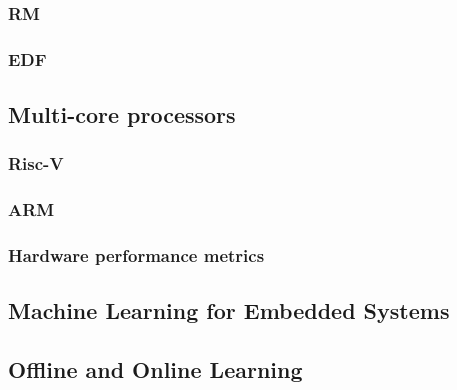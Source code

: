 \documentclass[journal,onecolumn]{IEEEtran}
\begin{document}
\subsubsection{RM}

\subsubsection{EDF}

\subsection{Multi-core processors}

\subsubsection{Risc-V}

\subsubsection{ARM}

\subsubsection{Hardware performance metrics}

\subsection{Machine Learning for Embedded Systems}

\subsection{Offline and Online Learning}

\newpage

\ifCLASSOPTIONcaptionsoff
  \newpage
\fi



\end{document}
